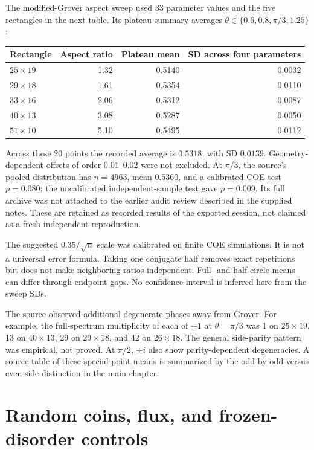 \documentclass[11pt,a4paper,oneside]{report}
\numberwithin{equation}{chapter}
\begin{document}
The modified-Grover aspect sweep used 33 parameter values and the
five rectangles in the next table. Its plateau summary averages
\(\theta\in\{0.6,0.8,\pi/3,1.25\}\):
\begin{center}
\begin{tabular}{@{}lrrr@{}}
\toprule
Rectangle&Aspect ratio&Plateau mean&SD across four parameters\\
\midrule
\(25\times19\)&1.32&0.5140&0.0032\\
\(29\times18\)&1.61&0.5354&0.0110\\
\(33\times16\)&2.06&0.5312&0.0087\\
\(40\times13\)&3.08&0.5287&0.0050\\
\(51\times10\)&5.10&0.5495&0.0112\\
\bottomrule
\end{tabular}
\end{center}
Across these 20 points the recorded average is \(0.5318\), with
SD \(0.0139\). Geometry-dependent offsets of order \(0.01\)--\(0.02\)
were not excluded. At \(\pi/3\), the source's pooled distribution
has \(n=4963\), mean \(0.5360\), and a calibrated COE test
\(p=0.080\); the uncalibrated independent-sample test gave
\(p=0.009\). Its full archive was not attached to the earlier audit
review described in the supplied notes. These are retained as recorded results
of the exported session, not claimed as a fresh independent reproduction.

The suggested \(0.35/\sqrt n\) scale was calibrated on finite COE
simulations. It is not a universal error formula. Taking one conjugate
half removes exact repetitions but does not make neighboring ratios
independent. Full- and half-circle means can differ through endpoint
gaps. No confidence interval is inferred here from the sweep SDs.

The source observed additional degenerate phases away from Grover.
For example, the full-spectrum multiplicity of each of \(\pm1\) at
\(\theta=\pi/3\) was 1 on \(25\times19\), 13 on \(40\times13\),
29 on \(29\times18\), and 42 on \(26\times18\). The general
side-parity pattern was empirical, not proved. At \(\pi/2\),
\(\pm i\) also show parity-dependent degeneracies. A source table
of these special-point means is summarized by the odd-by-odd versus
even-side distinction in the main chapter.

\section{Random coins, flux, and frozen-disorder controls}
\end{document}
